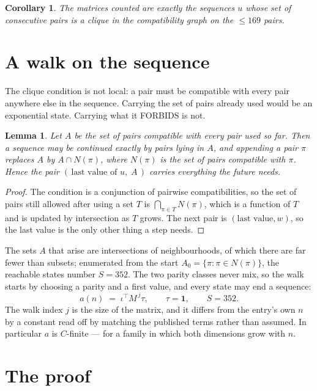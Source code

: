 \documentclass[11pt,a4paper]{article}
\theoremstyle{plain}
\newtheorem{lemma}[theorem]{Lemma}
\newtheorem{corollary}[theorem]{Corollary}
\theoremstyle{definition}
\begin{document}
\begin{corollary}
The matrices counted are exactly the sequences $u$ whose set of consecutive pairs is a clique in
the compatibility graph on the $\le 169$ pairs.
\end{corollary}

\section{A walk on the sequence}

The clique condition is not local: a pair must be compatible with every pair anywhere else in
the sequence. Carrying the set of pairs already used would be an exponential state. Carrying
what it FORBIDS is not.

\begin{lemma}\label{lem:lump}
Let $A$ be the set of pairs compatible with every pair used so far. Then a sequence may be
continued exactly by pairs lying in $A$, and appending a pair $\pi$ replaces $A$ by
$A\cap N(\pi)$, where $N(\pi)$ is the set of pairs compatible with $\pi$. Hence the pair
$(\,\text{last value of }u,\;A\,)$ carries everything the future needs.
\end{lemma}

\begin{proof}
The condition is a conjunction of pairwise compatibilities, so the set of pairs still allowed
after using a set $T$ is $\bigcap_{\pi\in T}N(\pi)$, which is a function of $T$ and is updated
by intersection as $T$ grows. The next pair is $(\text{last value},w)$, so the last value is
the only other thing a step needs.
\end{proof}

The sets $A$ that arise are intersections of neighbourhoods, of which there are far fewer than
subsets; enumerated from the start $A_0=\{\pi:\pi\in N(\pi)\}$, the reachable states number
$S=352$. The two parity classes never mix, so the walk starts by choosing a parity and a first
value, and every state may end a sequence:
\[
a(n)\;=\;\iota^{\!\top}M^{\,j}\tau ,\qquad \tau=\mathbf{1},\qquad S=352.
\]
The walk index $j$ is the size of the matrix, and it differs from the entry's own $n$ by a
constant read off by matching the published terms rather than assumed. In particular $a$ is
$C$-finite --- for a family in which both dimensions grow with $n$.

\section{The proof}
\end{document}
